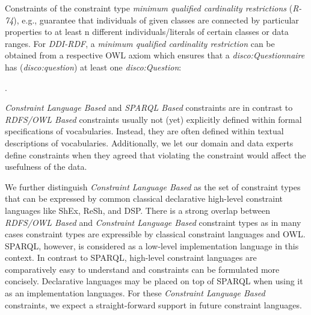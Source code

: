 \documentclass[conference]{IEEEtran}
\newcommand{\ms}[1]{\texttt{#1}}
\begin{document}
Constraints of the constraint type \emph{minimum qualified cardinality restrictions} (\emph{R-74}), e.g., guarantee that individuals of given classes are connected by particular properties to at least n different individuals/literals of certain classes or data ranges. For \emph{DDI-RDF}, a \emph{minimum qualified cardinality restriction} can be obtained from a respective OWL axiom which ensures that a \emph{disco:Questionnaire} has (\emph{disco:question}) at least one \emph{disco:Question}:
\begin{ex}
 .
\end{ex}


\emph{Constraint Language Based} and \emph{SPARQL Based} constraints are in contrast to \emph{RDFS/OWL Based} constraints usually not (yet) explicitly defined within formal specifications of vocabularies. Instead, they are often defined within textual descriptions of vocabularies. Additionally, we let our domain and data experts define constraints when they agreed that violating the constraint would affect the usefulness of the data.

We further distinguish \emph{Constraint Language Based} as the set of constraint types that can be expressed by common classical declarative high-level constraint languages like ShEx, ReSh, and DSP. 
There is a strong overlap between \emph{RDFS/OWL Based} and \emph{Constraint Language Based} constraint types as in many cases constraint types are expressible by classical constraint languages and OWL. SPARQL, however, is considered as a low-level implementation language in this context. In contrast to SPARQL, high-level constraint languages are comparatively easy to understand and constraints can be formulated more concisely. Declarative languages may be placed on top of SPARQL when using it as an implementation languages. For these \emph{Constraint Language Based} constraints, we expect a straight-forward support in future constraint languages.
\end{document}
